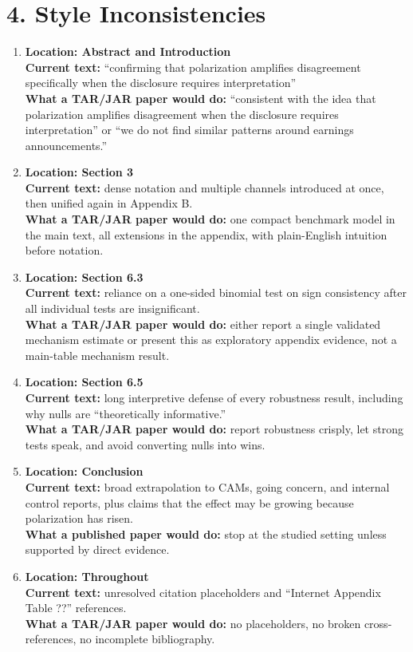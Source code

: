 \documentclass[11pt]{article}
\begin{document}
\section*{4. Style Inconsistencies}

\begin{enumerate}[leftmargin=1.5em]
    \item \textbf{Location: Abstract and Introduction}\\
    \textbf{Current text:} ``confirming that polarization amplifies disagreement specifically when the disclosure requires interpretation''\\
    \textbf{What a TAR/JAR paper would do:} ``consistent with the idea that polarization amplifies disagreement when the disclosure requires interpretation'' or ``we do not find similar patterns around earnings announcements.''

    \item \textbf{Location: Section 3}\\
    \textbf{Current text:} dense notation and multiple channels introduced at once, then unified again in Appendix B.\\
    \textbf{What a TAR/JAR paper would do:} one compact benchmark model in the main text, all extensions in the appendix, with plain-English intuition before notation.

    \item \textbf{Location: Section 6.3}\\
    \textbf{Current text:} reliance on a one-sided binomial test on sign consistency after all individual tests are insignificant.\\
    \textbf{What a TAR/JAR paper would do:} either report a single validated mechanism estimate or present this as exploratory appendix evidence, not a main-table mechanism result.

    \item \textbf{Location: Section 6.5}\\
    \textbf{Current text:} long interpretive defense of every robustness result, including why nulls are ``theoretically informative.''\\
    \textbf{What a TAR/JAR paper would do:} report robustness crisply, let strong tests speak, and avoid converting nulls into wins.

    \item \textbf{Location: Conclusion}\\
    \textbf{Current text:} broad extrapolation to CAMs, going concern, and internal control reports, plus claims that the effect may be growing because polarization has risen.\\
    \textbf{What a published paper would do:} stop at the studied setting unless supported by direct evidence.

    \item \textbf{Location: Throughout}\\
    \textbf{Current text:} unresolved citation placeholders and ``Internet Appendix Table ??'' references.\\
    \textbf{What a TAR/JAR paper would do:} no placeholders, no broken cross-references, no incomplete bibliography.
\end{enumerate}
\end{document}
